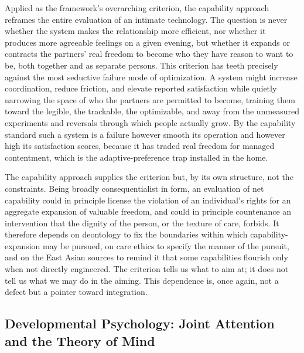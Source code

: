 Applied as the framework's overarching criterion, the capability approach reframes the entire evaluation of an intimate technology. The question is never whether the system makes the relationship more efficient, nor whether it produces more agreeable feelings on a given evening, but whether it expands or contracts the partners' real freedom to become who they have reason to want to be, both together and as separate persons. This criterion has teeth precisely against the most seductive failure mode of optimization. A system might increase coordination, reduce friction, and elevate reported satisfaction while quietly narrowing the space of who the partners are permitted to become, training them toward the legible, the trackable, the optimizable, and away from the unmeasured experiments and reversals through which people actually grow. By the capability standard such a system is a failure however smooth its operation and however high its satisfaction scores, because it has traded real freedom for managed contentment, which is the adaptive-preference trap installed in the home.

The capability approach supplies the criterion but, by its own structure, not the constraints. Being broadly consequentialist in form, an evaluation of net capability could in principle license the violation of an individual's rights for an aggregate expansion of valuable freedom, and could in principle countenance an intervention that the dignity of the person, or the texture of care, forbids. It therefore depends on deontology to fix the boundaries within which capability-expansion may be pursued, on care ethics to specify the manner of the pursuit, and on the East Asian sources to remind it that some capabilities flourish only when not directly engineered. The criterion tells us what to aim at; it does not tell us what we may do in the aiming. This dependence is, once again, not a defect but a pointer toward integration.

\subsection{Developmental Psychology: Joint Attention and the Theory of Mind}\label{p01:sec:devpsych}

